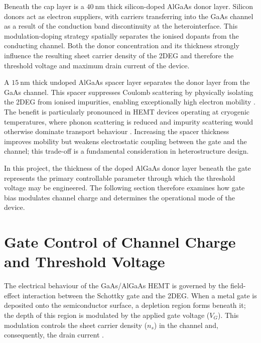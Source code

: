 \vspace{2mm}

Beneath the cap layer is a $40~\text{nm}$ thick silicon-doped AlGaAs
donor layer. Silicon donors act as electron suppliers, with carriers
transferring into the GaAs channel as a result of the conduction band
discontinuity at the heterointerface. This modulation-doping strategy
spatially separates the ionised dopants from the conducting channel.
Both the donor concentration and its thickness strongly influence the
resulting sheet carrier density of the 2DEG and therefore the threshold
voltage and maximum drain current of the device.

\vspace{2mm}

A $15~\text{nm}$ thick undoped AlGaAs spacer layer separates the donor
layer from the GaAs channel. This spacer suppresses Coulomb scattering
by physically isolating the 2DEG from ionised impurities, enabling
exceptionally high electron mobility \cite{Hirakawa1986}. The benefit is
particularly pronounced in HEMT devices operating at cryogenic
temperatures, where phonon scattering is reduced and impurity
scattering would otherwise dominate transport behaviour
\cite{Pfeiffer1989}. Increasing the spacer thickness improves mobility
but weakens electrostatic coupling between the gate and the channel;
this trade-off is a fundamental consideration in heterostructure
design.

\vspace{2mm}

In this project, the thickness of the doped AlGaAs donor layer beneath
the gate represents the primary controllable parameter through which
the threshold voltage may be engineered. The following section therefore
examines how gate bias modulates channel charge and determines the
operational mode of the device.

\section{Gate Control of Channel Charge and Threshold Voltage}

The electrical behaviour of the GaAs/AlGaAs HEMT is governed by the
field-effect interaction between the Schottky gate and the 2DEG. When a
metal gate is deposited onto the semiconductor surface, a depletion
region forms beneath it; the depth of this region is modulated by the
applied gate voltage ($V_G$). This modulation controls the sheet carrier
density ($n_s$) in the channel and, consequently, the drain current
\cite{sze2021}.

